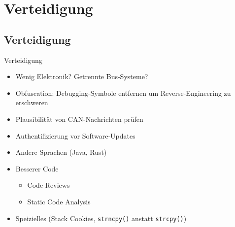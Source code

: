 \section{Verteidigung}

\subsection{Verteidigung}

\begin{frame}[fragile]{Verteidigung}
    \begin{itemize}[<+->]
        \item Wenig Elektronik? Getrennte Bus-Systeme?
        \item Obfuscation: Debugging-Symbole entfernen um Reverse-Engineering
              zu erschweren
        \item Plausibilität von CAN-Nachrichten prüfen
        \item Authentifizierung vor Software-Updates
        \item Andere Sprachen (Java, Rust)
        \item Besserer Code
        \begin{itemize}
            \item Code Reviews
            \item Static Code Analysis
        \end{itemize}
        \item Speizielles (Stack Cookies, \verb+strncpy()+ anstatt \verb+strcpy()+)
    \end{itemize}
\end{frame}